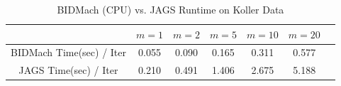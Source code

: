 \documentclass{article} %
\begin{document}
%
%
%
%
%
%
%
%
\begin{table}[t]
\caption{BIDMach (CPU) vs. JAGS Runtime on Koller Data}
\label{tab:bidmach_jags_koller}
\begin{center}
\begin{tabular}{ |c|c|c|c|c|c|c| } 
\hline
                         & $m=1$ & $m=2$ & $m=5$ & $m=10$ & $m=20$ \\
\hline \hline
BIDMach Time(sec) / Iter & 0.055 & 0.090 & 0.165 & 0.311  & 0.577  \\ 
JAGS Time(sec) / Iter    & 0.210 & 0.491 & 1.406 & 2.675  & 5.188  \\
\hline
\end{tabular}
\end{center}
\end{table}
\end{document}
